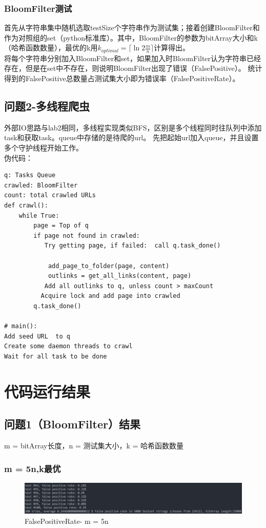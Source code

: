 \documentclass[12pt,a4paper]{article}
\begin{document}
\subsubsection{BloomFilter测试}
首先从字符串集中随机选取testSize个字符串作为测试集；接着创建BloomFilter和作为对照组的set（python标准库）。其中，BloomFilter的参数为bitArray大小和k（哈希函数数量），最优的k用$k_{optimal} = \lceil \ln{2} \frac{m}{n} \rceil$计算得出。\\
将每个字符串分别加入BloomFilter和set，如果加入时BloomFilter认为字符串已经存在，但是在set中不存在，则说明BloomFilter出现了错误（FalsePositive）。
统计得到的FalsePositive总数量占测试集大小即为错误率（FalsePositiveRate）。
\subsection{问题2-多线程爬虫}
外部IO思路与lab2相同，多线程实现类似BFS，区别是多个线程同时往队列中添加task和获取task。queue中存储的是待爬的url。
先把起始url加入queue，并且设置多个守护线程开始工作。\\
伪代码：\\
\begin{lstlisting}
q: Tasks Queue
crawled: BloomFilter
count: total crawled URLs
def crawl():
    while True:
        page = Top of q
        if page not found in crawled:
           Try getting page, if failed:  call q.task_done()
           
            add_page_to_folder(page, content)
            outlinks = get_all_links(content, page)
           Add all outlinks to q, unless count > maxCount
		  Acquire lock and add page into crawled      
        q.task_done()
        
# main():
Add seed URL  to q
Create some daemon threads to crawl
Wait for all task to be done
\end{lstlisting}

\newpage
\section{代码运行结果}
\subsection{问题1（BloomFilter）结果}
m = bitArray长度，n = 测试集大小，k = 哈希函数数量
\subsubsection{m = 5n,k最优}
\begin{figure}[H]
	\includegraphics[scale=0.6]{fpr_l.png}
	\centering
	 \caption{FalsePositiveRate- m = 5n}
\end{figure}
\end{document}
